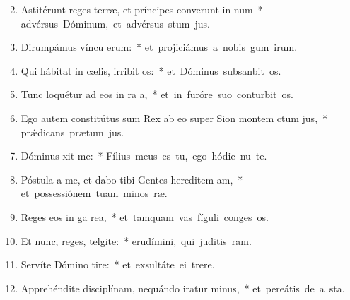 \begin{flushleft}
\begin{enumerate}[leftmargin=*]
\setcounter{enumi}{1}

\item Astitérunt reges terræ, et príncipes converunt in num~* \mbox{advérsus Dóminum, et advérsus stum jus.}

\item Dirumpámus víncu erum:~* \mbox{et projiciámus a nobis gum irum.}

\item Qui hábitat in cælis, irribit os:~* \mbox{et Dóminus subsanbit os.}

\item Tunc loquétur ad eos in ra a,~* \mbox{et in furóre suo conturbit os.}

\item Ego autem constitútus sum Rex ab eo super Sion montem ctum jus,~* \mbox{pr\'{\ae}dicans prætum jus.}

\item Dóminus xit  me:~* \mbox{Fílius meus es tu, ego hódie nu te.}

\item Póstula a me, et dabo tibi Gentes hereditem am,~* \mbox{et possessiónem tuam minos ræ.}

\item Reges eos in ga rea,~* \mbox{et tamquam vas fíguli conges os.}

\item Et nunc, reges, telgite:~* \mbox{erudímini, qui juditis ram.}

\item Servíte Dómino  tire:~* \mbox{et exsultáte ei  trere.}

\item Apprehéndite disciplínam, nequándo iratur minus,~* \mbox{et pereátis de a sta.}


\end{enumerate}
\end{flushleft}
